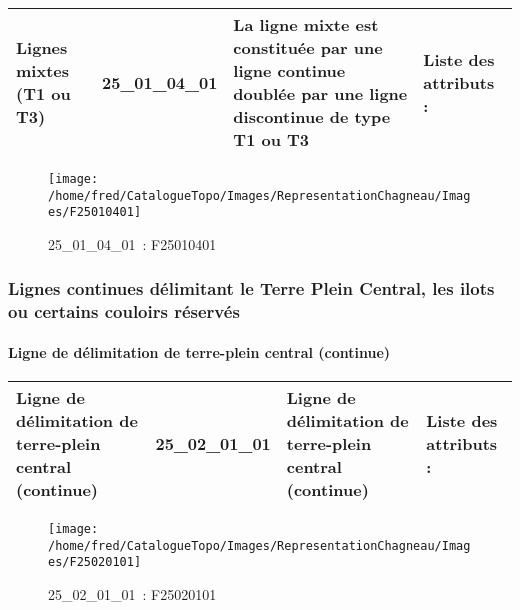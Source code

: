 \documentclass[12pt,titlepage,oneside]{book}
\begin{document}
\renewcommand{\arraystretch}{1.2}
\begin{supertabular}{|p{10cm}|c|p{13cm}|p{12cm}|}
 Lignes mixtes (T1 ou T3) & 25\_01\_04\_01 & La ligne mixte est constituée par une ligne continue doublée par une ligne discontinue de type T1 ou T3 & Liste des attributs :
\begin{enumerate}
\end{enumerate}
\\
\hline
\end{supertabular}
\begin{figure}[h!]
  \hfill         %
  \begin{minipage}[t]{3cm}
    \begin{center}
      \texttt{[image: /home/fred/CatalogueTopo/Images/RepresentationChagneau/Images/F25010401]}
      \caption[~25\_01\_04\_01]{\small{25\_01\_04\_01~:} \tiny{F25010401}}\label{F25010401}
    \end{center}
  \end{minipage}
\end{figure}

\subsubsection{\large Lignes continues délimitant le Terre Plein Central, les ilots ou certains couloirs réservés}
\paragraph{Ligne de délimitation de terre-plein central (continue)}
\noindent
\vspace{\baselineskip}

\renewcommand{\arraystretch}{1.2}
\begin{supertabular}{|p{10cm}|c|p{13cm}|p{12cm}|}
 Ligne de délimitation de terre-plein central (continue) & 25\_02\_01\_01 & Ligne de délimitation de terre-plein central (continue) & Liste des attributs :
\begin{enumerate}
\end{enumerate}
\\
\hline
\end{supertabular}
\begin{figure}[h!]
  \hfill         %
  \begin{minipage}[t]{3cm}
    \begin{center}
      \texttt{[image: /home/fred/CatalogueTopo/Images/RepresentationChagneau/Images/F25020101]}
      \caption[~25\_02\_01\_01]{\small{25\_02\_01\_01~:} \tiny{F25020101}}\label{F25020101}
    \end{center}
  \end{minipage}
\end{figure}
\end{document}
